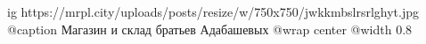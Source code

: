  
 
 
 
 

\ifcmt
  ig https://mrpl.city/uploads/posts/resize/w/750x750/jwkkmbslrsrlghyt.jpg
	@caption Магазин и склад братьев Адабашевых
  @wrap center
  @width 0.8
\fi
